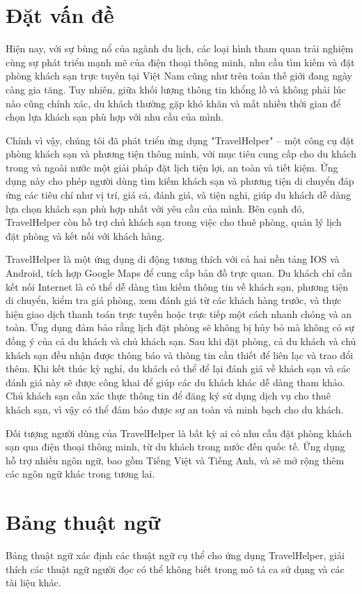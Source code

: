 \section{Đặt vấn đề}
Hiện nay, với sự bùng nổ của ngành du lịch, các loại hình tham quan trải nghiệm cùng sự phát triển mạnh mẽ của điện thoại thông minh, nhu cầu tìm kiếm và đặt phòng khách sạn trực tuyến tại Việt Nam cũng như trên toàn thế giới đang ngày càng gia tăng. Tuy nhiên, giữa khối lượng thông tin khổng lồ và không phải lúc nào cũng chính xác, du khách thường gặp khó khăn và mất nhiều thời gian để chọn lựa khách sạn phù hợp với nhu cầu của mình.

Chính vì vậy, chúng tôi đã phát triển ứng dụng "TravelHelper" – một công cụ đặt phòng khách sạn và phương tiện thông minh, với mục tiêu cung cấp cho du khách trong và ngoài nước một giải pháp đặt lịch tiện lợi, an toàn và tiết kiệm. Ứng dụng này cho phép người dùng tìm kiếm khách sạn và phương tiện di chuyển đáp ứng các tiêu chí như vị trí, giá cả, đánh giá, và tiện nghi, giúp du khách dễ dàng lựa chọn khách sạn phù hợp nhất với yêu cầu của mình. Bên cạnh đó, TravelHelper còn hỗ trợ chủ khách sạn trong việc cho thuê phòng, quản lý lịch đặt phòng và kết nối với khách hàng.

TravelHelper là một ứng dụng di động tương thích với cả hai nền tảng IOS và Android, tích hợp Google Maps để cung cấp bản đồ trực quan. Du khách chỉ cần kết nối Internet là có thể dễ dàng tìm kiếm thông tin về khách sạn, phương tiện di chuyển, kiểm tra giá phòng, xem đánh giá từ các khách hàng trước, và thực hiện giao dịch thanh toán trực tuyến hoặc trực tiếp một cách nhanh chóng và an toàn. Ứng dụng đảm bảo rằng lịch đặt phòng sẽ không bị hủy bỏ mà không có sự đồng ý của cả du khách và chủ khách sạn. Sau khi đặt phòng, cả du khách và chủ khách sạn đều nhận được thông báo và thông tin cần thiết để liên lạc và trao đổi thêm. Khi kết thúc kỳ nghỉ, du khách có thể để lại đánh giá về khách sạn và các đánh giá này sẽ được công khai để giúp các du khách khác dễ dàng tham khảo. Chủ khách sạn cần xác thực thông tin để đăng ký sử dụng dịch vụ cho thuê khách sạn, vì vậy có thể đảm bảo được sự an toàn và minh bạch cho du khách.

Đối tượng người dùng của TravelHelper là bất kỳ ai có nhu cầu đặt phòng khách sạn qua điện thoại thông minh, từ du khách trong nước đến quốc tế. Ứng dụng hỗ trợ nhiều ngôn ngữ, bao gồm Tiếng Việt và Tiếng Anh, và sẽ mở rộng thêm các ngôn ngữ khác trong tương lai.

\section{Bảng thuật ngữ}
Bảng thuật ngữ xác định các thuật ngữ cụ thể cho ứng dụng TravelHelper, giải thích các thuật ngữ người đọc có thể không biết trong mô tả ca sử dụng và các tài liệu khác.

